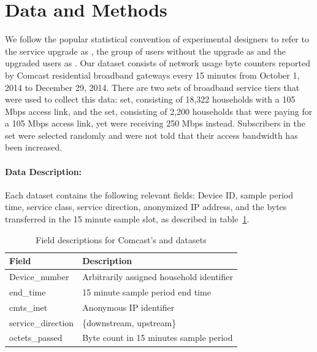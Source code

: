 \section{Data and Methods}\label{sec:data}

We follow the popular statistical convention of experimental designers to 
refer to the service upgrade as \factor{}, the group of users without the 
upgrade as \control{} and the upgraded users as \treatment{} 
\cite{stats-design}. Our dataset consists of network usage byte counters 
reported by Comcast residential broadband gateways every 15 minutes from October 
1, 2014 to December 29, 2014. There are two sets of broadband service tiers that 
were used to collect this data: \control{} set, consisting of 
18,322 households with a 105 Mbps access link, and the 
\treatment{} set, consisting of 2,200 households that were 
paying for a 105 Mbps access link, yet were receiving 250 Mbps instead. 
Subscribers in the \treatment{} set were selected randomly and were not told 
that their access bandwidth has been increased.


\paragraph{Data Description: }Each dataset contains the following relevant 
fields: Device ID, sample period time, service class, service direction, 
anonymized IP address, and the bytes transferred in the 15 minute sample slot, 
as described in table~\ref{tab:field-description}.

\begin{table}[t]
\small
\begin{tabular}{ l l }
\hline
\textbf{Field}         & \textbf{Description}				\\\hline
Device\_number         & Arbitrarily assigned household identifier	\\
end\_time              & 15 minute sample period end time		\\
cmts\_inet             & Anonymous IP identifier			\\
service\_direction     & \{downstream, upstream\}                 	\\
octets\_passed         & Byte count in 15 minutes sample period		\\\hline
\end{tabular}
\caption{Field descriptions for Comcast's \control{} and \treatment{} datasets}
\label{tab:field-description}
\end{table}


